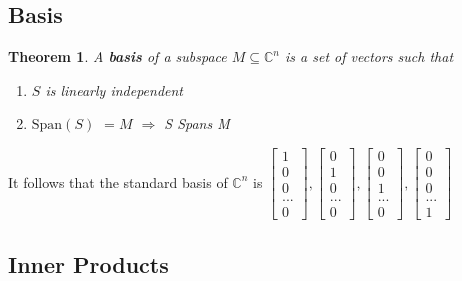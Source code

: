 \documentclass[12pt]{article}
\theoremstyle{plain}
\newtheorem{theorem}[lemma]{Theorem}
\theoremstyle{nonumberplain}
\theoremstyle{plain}
\theoremstyle{nonumberplain}
\newcommand\1{{\bf 1}}
\newcommand{\bmat}[1]{\begin{bmatrix*} #1 \end{bmatrix*}} %
\newcommand{\C}{\mathbb{C}} %
\newcommand{\<}{\left\langle}
\renewcommand{\>}{\right\rangle}
\newcommand{\lp}{\left(}
\newcommand{\rp}{\right)}
\newcommand{\spn}[1]{\text{Span}\lp #1\rp} %
\begin{document}
\subsection{Basis}
\begin{theorem}
A \textbf{basis} of a subspace $M\subseteq\C^n$ is a set of vectors such that
\begin{enumerate}
	\item $S$ is linearly independent
	\item $\spn{S}$ $=M$ $\Longrightarrow$ \textit{S Spans M}
\end{enumerate}
\end{theorem}
It follows that the standard basis of $\C^n$ is $\bmat{1 \\ 0 \\ 0 \\ ... \\ 0},\bmat{0 \\ 1 \\ 0 \\ ... \\ 0},\bmat{0 \\ 0 \\ 1 \\ ... \\ 0},\bmat{0 \\ 0 \\ 0 \\ ... \\ 1}$


\subsection{Inner Products}
\end{document}

